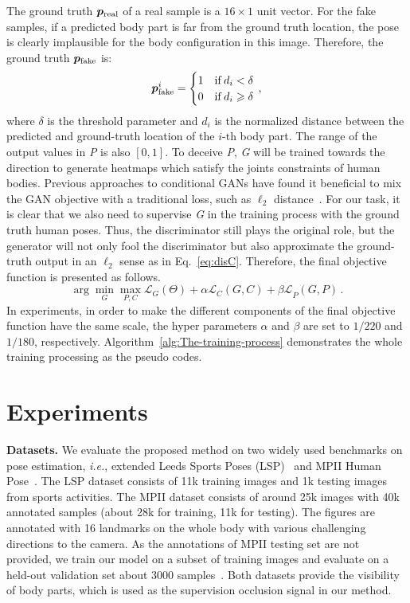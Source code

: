 \documentclass[10pt,letterpaper,twocolumn]{article}
\begin{document}
The ground truth $\bm{p}_{\rm real}$ of a real sample is a $16\times 1$ unit vector. For the fake samples, if a predicted body part is far from the ground truth location, the pose is clearly implausible  for the body configuration in this image. Therefore, the ground truth $\bm{p}_{\rm fake}$ is:
\begin{equation}
\nonumber
\bm{p}_{\rm fake}^{i}=\begin{cases}
1 & {\rm if}\thinspace d_{i}<\delta\\
0 & {\rm if}\thinspace d_{i}\geqslant\delta
\end{cases}\,,
\end{equation}
where $\delta$ is the threshold parameter and $d_{i}$ is the normalized distance between the predicted and ground-truth location of the $i$-$\textrm{th}$ body part. The range of the output values in \textit{P} is also $\left[0,1\right]$. To deceive \textit{P}, \textit{G} will be trained towards the direction to generate heatmaps which satisfy the joints constraints of human bodies. Previous approaches to conditional GANs have found it beneficial to mix the GAN objective with a  traditional loss, such as $\ell_2$ distance~\cite{conf/cvpr/PathakKDDE16}. For our task, it is clear  that we also need to supervise \textit{G} in the training process with the ground truth human poses. Thus, the discriminator still plays the original role, but the generator will not only fool the discriminator but also approximate the ground-truth output in an $\ell_2$ sense as in Eq.~\eqref{eq:disC}. Therefore, the final objective function is presented as follows.
\begin{equation}
\label{eq:final}
\arg \min_G \max_{P,C}  \mathcal{L}_{G}(\Theta)+\mathcal{\alpha L}_{C}(G,C)+\mathcal{\beta L}_{P}(G,P) \,.
\end{equation}
In experiments, in order to make the different components of the final objective function have the same scale, the hyper parameters $\alpha$ and $\beta$ are set to $1/220$ and $1/180$, respectively. Algorithm~\ref{alg:The-training-process} demonstrates the whole training processing as the pseudo codes.

\section{Experiments}\label{sec:Experiments}

\noindent \textbf{Datasets.} We evaluate the proposed method on two widely used benchmarks on pose estimation, \emph{i.e.}, extended Leeds Sports Poses (LSP)~\cite{conf/bmvc/JohnsonE10} and MPII Human Pose~\cite{conf/cvpr/AndrilukaPGS14}. The LSP dataset consists of 11k training images and 1k testing images from sports activities. The MPII dataset consists of around 25k images with 40k annotated samples (about 28k for training, 11k for testing). The figures are annotated with 16 landmarks on the whole body with various challenging directions to the camera. As the annotations of MPII testing set are not provided, we train our model on a subset of training images and evaluate on a held-out validation set about 3000 samples~\cite{conf/cvpr/TompsonGJLB15}. Both datasets provide the visibility of body parts, which is used as the supervision occlusion signal in our method.
\end{document}
